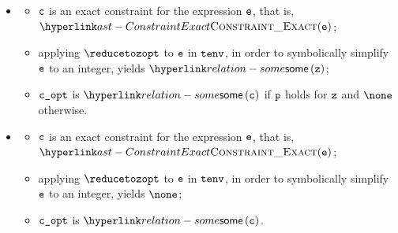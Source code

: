\ProseParagraph
\OneApplies
\begin{itemize}
  \item {}
  \begin{itemize}
    \item $\texttt{c}$ is an exact constraint for the expression $\texttt{e}$, that is, $\ConstraintExact(\ve)$;
    \item applying $\reducetozopt$ to $\texttt{e}$ in $\texttt{tenv}$, in order to symbolically simplify $\texttt{e}$ to an integer,
          yields $\some{\vz}$;
    \item $\texttt{c\_opt}$ is $\some{\vc}$ if $\texttt{p}$ holds for $\texttt{z}$ and $\none$ otherwise.
  \end{itemize}

  \item {}
  \begin{itemize}
    \item $\texttt{c}$ is an exact constraint for the expression $\texttt{e}$, that is, $\ConstraintExact(\ve)$;
    \item applying $\reducetozopt$ to $\texttt{e}$ in $\texttt{tenv}$, in order to symbolically simplify $\texttt{e}$ to an integer,
          yields $\none$;
    \item $\texttt{c\_opt}$ is $\some{\vc}$.
  \end{itemize}


\end{itemize}
